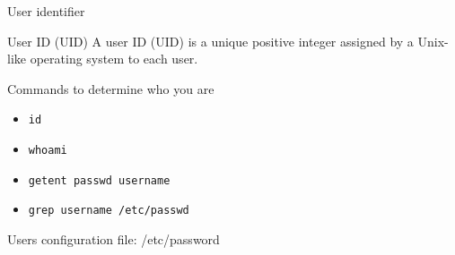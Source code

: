 \begin{frame}[fragile]{User identifier}

\begin{block}{User ID (UID)}
\alert{A user ID (UID)} is a unique positive integer assigned by a Unix-like operating system to each user.
\end{block}

Commands to determine who you are
  \begin{itemize}
    \item \verb|id|
    \item \verb|whoami|
    \item \verb|getent passwd username |
    \item \verb|grep username /etc/passwd |
  \end{itemize}
Users configuration file:  \alert{/etc/password}
\end{frame}
